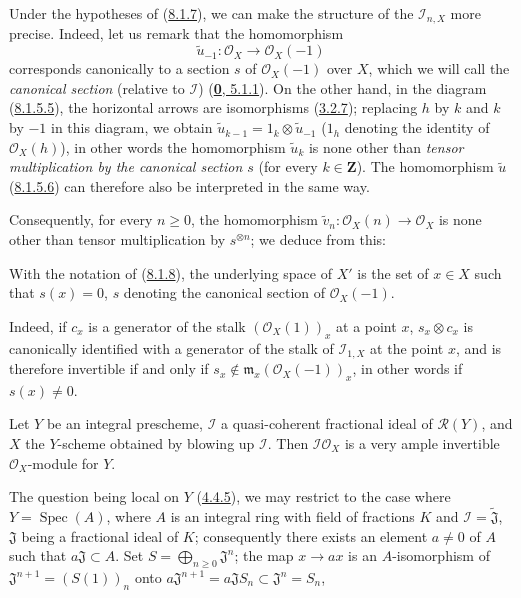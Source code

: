 \begin{env}[8.1.9]
\label{II.8.1.9}
Under the hypotheses of (\hyperref[II.8.1.7]{8.1.7}), we can make the
structure of the $\mathcal{I}_{n,X}$ more precise. Indeed, let us remark that the homomorphism
\[
  \widetilde{u}_{-1}:\mathcal{O}_X\to\mathcal{O}_X(-1)
\]
corresponds canonically to a section $s$ of $\mathcal{O}_X(-1)$ over
$X$, which we will call the \emph{canonical section} (relative to
$\mathcal{I}$) (\hyperref[0.5.1.1]{\textbf{0}, 5.1.1}). On the other hand, in the
diagram (\hyperref[II.8.1.5.5]{8.1.5.5}), the horizontal arrows are
isomorphisms (\hyperref[II.3.2.7]{3.2.7}); replacing $h$ by $k$ and $k$ by
$-1$ in this diagram, we obtain
$\widetilde{u}_{k-1}=1_k\otimes\widetilde{u}_{-1}$ ($1_h$ denoting the identity of
$\mathcal{O}_X(h)$), in other words the homomorphism $\widetilde{u}_k$ is
none other than \emph{tensor multiplication by the canonical section $s$}
(for every $k\in\mathbf{Z}$). The homomorphism $\widetilde{u}$
(\hyperref[II.8.1.5.6]{8.1.5.6}) can therefore also be interpreted in the same way.

Consequently, for every $n\geq0$, the homomorphism
$\widetilde{v}_n:\mathcal{O}_X(n)\to\mathcal{O}_X$ is none other than
tensor multiplication by $s^{\otimes n}$; we deduce from this:
\end{env}

\begin{corollary}[8.1.10]
\label{II.8.1.10}
With the notation of \textup{(\hyperref[II.8.1.8]{8.1.8})}, the underlying space of
$X'$ is the set of $x\in X$ such that $s(x)=0$, $s$ denoting the canonical
section of $\mathcal{O}_X(-1)$.
\end{corollary}

Indeed, if $c_x$ is a generator of the stalk $(\mathcal{O}_X(1))_x$ at a
point $x$, $s_x\otimes c_x$ is canonically identified with a generator of the
stalk of $\mathcal{I}_{1,X}$ at the point $x$, and is therefore invertible if and
only if $s_x\notin\mathfrak{m}_x(\mathcal{O}_X(-1))_x$, in other words if
$s(x)\neq0$.

\begin{proposition}[8.1.11]
\label{II.8.1.11}
Let $Y$ be an integral prescheme, $\mathcal{I}$ a quasi-coherent fractional
ideal of $\mathcal{R}(Y)$, and $X$ the $Y$-scheme obtained by blowing up
$\mathcal{I}$. Then $\mathcal{I}\mathcal{O}_X$ is a very ample invertible
$\mathcal{O}_X$-module for $Y$.
\end{proposition}

The question being local on $Y$ (\hyperref[II.4.4.5]{4.4.5}), we may
restrict to the case where $Y=\operatorname{Spec}(A)$, where $A$ is an integral
ring with field of fractions $K$ and $\mathcal{I}=\widetilde{\mathfrak{J}}$,
$\mathfrak{J}$ being a fractional ideal of $K$; consequently there exists an
element $a\neq0$ of $A$ such that $a\mathfrak{J}\subset A$. Set
$S=\bigoplus_{n\geq0}\mathfrak{J}^n$; the map $x\to ax$ is an
$A$-isomorphism of $\mathfrak{J}^{n+1}=(S(1))_n$ onto
$a\mathfrak{J}^{n+1}=a\mathfrak{J}S_n\subset\mathfrak{J}^n=S_n$,

